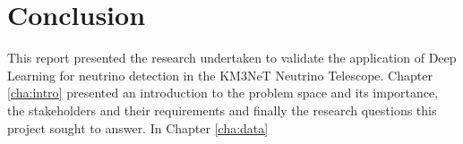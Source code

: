 
\chapter{Conclusion} %

% 

This report presented the research undertaken to validate the
application of Deep Learning for neutrino detection in the KM3NeT
Neutrino Telescope. Chapter \ref{cha:intro} presented an introduction
to the problem space and its importance, the stakeholders and their
requirements and finally the research questions this project sought to
answer. In Chapter \ref{cha:data}
